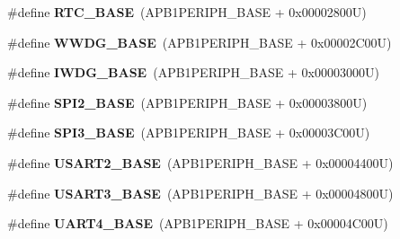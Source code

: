 \begin{DoxyCompactItemize}
\item 
\hypertarget{group___peripheral__memory__map_ga4265e665d56225412e57a61d87417022}{\#define {\bfseries R\-T\-C\-\_\-\-B\-A\-S\-E}~(A\-P\-B1\-P\-E\-R\-I\-P\-H\-\_\-\-B\-A\-S\-E + 0x00002800\-U)}\label{group___peripheral__memory__map_ga4265e665d56225412e57a61d87417022}

\item 
\hypertarget{group___peripheral__memory__map_ga9a5bf4728ab93dea5b569f5b972cbe62}{\#define {\bfseries W\-W\-D\-G\-\_\-\-B\-A\-S\-E}~(A\-P\-B1\-P\-E\-R\-I\-P\-H\-\_\-\-B\-A\-S\-E + 0x00002\-C00\-U)}\label{group___peripheral__memory__map_ga9a5bf4728ab93dea5b569f5b972cbe62}

\item 
\hypertarget{group___peripheral__memory__map_ga8543ee4997296af5536b007cd4748f55}{\#define {\bfseries I\-W\-D\-G\-\_\-\-B\-A\-S\-E}~(A\-P\-B1\-P\-E\-R\-I\-P\-H\-\_\-\-B\-A\-S\-E + 0x00003000\-U)}\label{group___peripheral__memory__map_ga8543ee4997296af5536b007cd4748f55}

\item 
\hypertarget{group___peripheral__memory__map_gac3e357b4c25106ed375fb1affab6bb86}{\#define {\bfseries S\-P\-I2\-\_\-\-B\-A\-S\-E}~(A\-P\-B1\-P\-E\-R\-I\-P\-H\-\_\-\-B\-A\-S\-E + 0x00003800\-U)}\label{group___peripheral__memory__map_gac3e357b4c25106ed375fb1affab6bb86}

\item 
\hypertarget{group___peripheral__memory__map_gae634fe8faa6922690e90fbec2fc86162}{\#define {\bfseries S\-P\-I3\-\_\-\-B\-A\-S\-E}~(A\-P\-B1\-P\-E\-R\-I\-P\-H\-\_\-\-B\-A\-S\-E + 0x00003\-C00\-U)}\label{group___peripheral__memory__map_gae634fe8faa6922690e90fbec2fc86162}

\item 
\hypertarget{group___peripheral__memory__map_gade83162a04bca0b15b39018a8e8ec090}{\#define {\bfseries U\-S\-A\-R\-T2\-\_\-\-B\-A\-S\-E}~(A\-P\-B1\-P\-E\-R\-I\-P\-H\-\_\-\-B\-A\-S\-E + 0x00004400\-U)}\label{group___peripheral__memory__map_gade83162a04bca0b15b39018a8e8ec090}

\item 
\hypertarget{group___peripheral__memory__map_gabe0d6539ac0026d598274ee7f45b0251}{\#define {\bfseries U\-S\-A\-R\-T3\-\_\-\-B\-A\-S\-E}~(A\-P\-B1\-P\-E\-R\-I\-P\-H\-\_\-\-B\-A\-S\-E + 0x00004800\-U)}\label{group___peripheral__memory__map_gabe0d6539ac0026d598274ee7f45b0251}

\item 
\hypertarget{group___peripheral__memory__map_ga94d92270bf587ccdc3a37a5bb5d20467}{\#define {\bfseries U\-A\-R\-T4\-\_\-\-B\-A\-S\-E}~(A\-P\-B1\-P\-E\-R\-I\-P\-H\-\_\-\-B\-A\-S\-E + 0x00004\-C00\-U)}\label{group___peripheral__memory__map_ga94d92270bf587ccdc3a37a5bb5d20467}


\end{DoxyCompactItemize}
